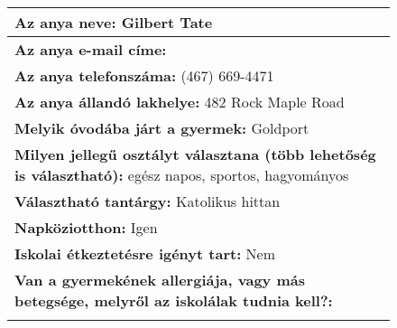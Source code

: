 \documentclass[10pt,a4paper]{article}
\begin{document}
\begin{figure}[!ht]
\begin{tabular}{|m{\textwidth}|}
\hline\vspace{3pt}
\textbf{Az anya neve:} \hspace{0.5cm} Gilbert Tate \vspace{3pt} \\
\hline\vspace{3pt}
\textbf{Az anya e-mail címe:} \hspace{0.5cm}   \vspace{3pt} \\
\hline\vspace{3pt}
\textbf{Az anya telefonszáma:} \hspace{0.5cm} (467) 669-4471 \vspace{3pt} \\
\hline\vspace{3pt}
\textbf{Az anya állandó lakhelye:} \hspace{0.5cm} 482 Rock Maple Road \vspace{3pt} \\
\hline\vspace{3pt}
\textbf{Melyik óvodába járt a gyermek:} \hspace{0.5cm} Goldport \vspace{3pt} \\
\hline\vspace{3pt}
\textbf{Milyen jellegű osztályt választana (több lehetőség is választható):} \hspace{0.5cm} egész napos, sportos, hagyományos \vspace{3pt} \\
\hline\vspace{3pt}
\textbf{Választható tantárgy:} \hspace{0.5cm} Katolikus hittan \vspace{3pt} \\
\hline\vspace{3pt}
\textbf{Napköziotthon:} \hspace{0.5cm} Igen \vspace{3pt} \\
\hline\vspace{3pt}
\textbf{Iskolai étkeztetésre igényt tart:} \hspace{0.5cm} Nem \vspace{3pt} \\
\hline\vspace{3pt}
\textbf{Van a gyermekének allergiája, vagy más betegsége, melyről az iskolálak tudnia kell?:} \\ \hspace{0.5cm}  \vspace{3pt} \\

\end{tabular}
\end{figure}
\end{document}
